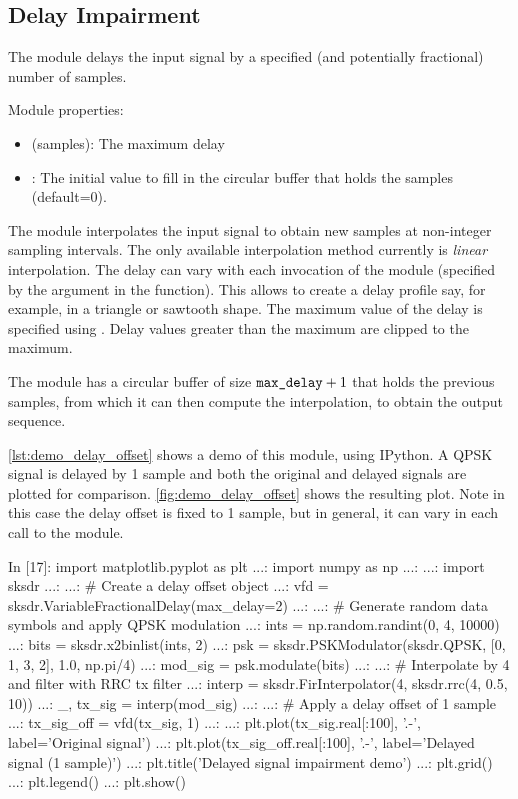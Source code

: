 \subsection{Delay Impairment}

The  module delays the input signal by a specified (and potentially fractional) number of samples.

\noindent Module properties:
\begin{itemize}
  \item {} (samples): The maximum delay
  \item {}: The initial value to fill in the circular buffer that holds the samples (default=0).
\end{itemize}

The module interpolates the input signal to obtain new samples at non-integer sampling intervals. The only available interpolation method currently is \emph{linear} interpolation. The delay can vary with each invocation of the module (specified by the  argument in the  function). This allows to create a delay profile say, for example, in a triangle or sawtooth shape. The maximum value of the delay is specified using . Delay values greater than the maximum are clipped to the maximum.

The module has a circular buffer of size $\texttt{max\_delay}+1$ that holds the previous samples, from which it can then compute the interpolation, to obtain the output sequence.

\autoref{lst:demo_delay_offset} shows a demo of this module, using IPython. A QPSK signal is delayed by 1 sample and both the original and delayed signals are plotted for comparison. \autoref{fig:demo_delay_offset} shows the resulting plot. Note in this case the delay offset is fixed to 1 sample, but in general, it can vary in each call to the module.

\begin{python}[label={lst:demo_delay_offset},caption={\code{VariableFractionalDelay} demo}]
  In [17]: import matplotlib.pyplot as plt
    ...: import numpy as np
    ...:
    ...: import sksdr
    ...:
    ...: # Create a delay offset object
    ...: vfd = sksdr.VariableFractionalDelay(max_delay=2)
    ...:
    ...: # Generate random data symbols and apply QPSK modulation
    ...: ints = np.random.randint(0, 4, 10000)
    ...: bits = sksdr.x2binlist(ints, 2)
    ...: psk = sksdr.PSKModulator(sksdr.QPSK, [0, 1, 3, 2], 1.0, np.pi/4)
    ...: mod_sig = psk.modulate(bits)
    ...:
    ...: # Interpolate by 4 and filter with RRC tx filter
    ...: interp = sksdr.FirInterpolator(4, sksdr.rrc(4, 0.5, 10))
    ...: _, tx_sig = interp(mod_sig)
    ...:
    ...: # Apply a delay offset of 1 sample
    ...: tx_sig_off = vfd(tx_sig, 1)
    ...:
    ...: plt.plot(tx_sig.real[:100], '.-', label='Original signal')
    ...: plt.plot(tx_sig_off.real[:100], '.-', label='Delayed signal (1 sample)')
    ...: plt.title('Delayed signal impairment demo')
    ...: plt.grid()
    ...: plt.legend()
    ...: plt.show()
\end{python}

